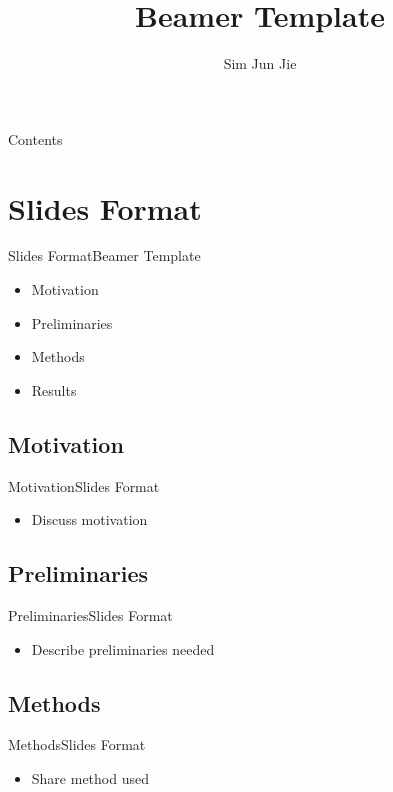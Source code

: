 \documentclass[hyperref={pdfpagemode=UseOutlines}]{beamer}
\title{Beamer Template}
\author{Sim Jun Jie}
\numberwithin{equation}{mycounter} %
\numberwithin{table}{mycounter}
\begin{document}
\frame{\titlepage}

\begin{frame}[allowframebreaks]{Contents}
    \tableofcontents[hideallsubsections]
\end{frame}

\section{Slides Format}
\begin{frame}{Slides Format}{Beamer Template}
    \begin{itemize}
        \item Motivation
        \item Preliminaries
        \item Methods
        \item Results
    \end{itemize}
\end{frame}

\subsection{Motivation}
\begin{frame}{Motivation}{Slides Format}
    \begin{itemize}
        \item Discuss motivation
    \end{itemize}
\end{frame}

\subsection{Preliminaries}
\begin{frame}{Preliminaries}{Slides Format}
    \begin{itemize}
        \item Describe preliminaries needed
    \end{itemize}
\end{frame}

\subsection{Methods}
\begin{frame}{Methods}{Slides Format}
    \begin{itemize}
        \item Share method used
    \end{itemize}
\end{frame}
\end{document}
